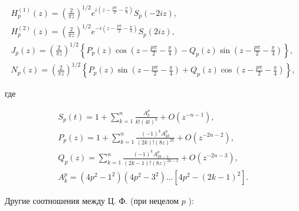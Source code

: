 \documentclass[10pt]{article}
\begin{document}
\[

\begin{gathered}

H_{p}^{(1)}(z)=\left(\frac{2}{\pi z}\right)^{1 / 2} e^{i\left(z-\frac{p \pi}{2}-\frac{\pi}{4}\right)} S_{p}(-2 i z), \\

H_{p}^{(2)}(z)=\left(\frac{2}{\pi z}\right)^{1 / 2} e^{-i\left(z-\frac{p \pi}{2}-\frac{\pi}{4}\right)} S_{p}(2 i z), \\

J_{p}(z)=\left(\frac{2}{\pi z}\right)^{1 / 2}\left\{P_{p}(z) \cos \left(z-\frac{p \pi}{2}-\frac{\pi}{4}\right)-Q_{p}(z) \sin \left(z-\frac{p \pi}{2}-\frac{\pi}{4}\right)\right\}, \\

N_{p}(z)=\left(\frac{2}{\pi z}\right)^{1 / 2}\left\{P_{p}(z) \sin \left(z-\frac{p \pi}{2}-\frac{\pi}{4}\right)+Q_{p}(z) \cos \left(z-\frac{p \pi}{2}-\frac{\pi}{4}\right)\right\},

\end{gathered}

\]



где



\[

\begin{gathered}

S_{p}(t)=1+\sum_{k=1}^{n} \frac{A_{k}^{p}}{k !(4 t)^{k}}+O\left(z^{-n-1}\right), \\

P_{p}(z)=1+\sum_{k=1}^{n} \frac{(-1)^{k} A_{2 k}^{p}}{(2 k) !(8 z)^{2 k}}+O\left(z^{-2 n-2}\right), \\

Q_{p}(z)=\sum_{k=1}^{n} \frac{(-1)^{k} A_{2 k-1}^{p}}{(2 k-1) !(8 z)^{2 k-1}}+O\left(z^{-2 n-3}\right), \\

A_{k}^{p}=\left(4 p^{2}-1^{2}\right)\left(4 p^{2}-3^{2}\right) \ldots\left[4 p^{2}-(2 k-1)^{2}\right] .

\end{gathered}

\]



Другие соотношения между Ц. Ф. (при нецелом $p$ ):
\end{document}

